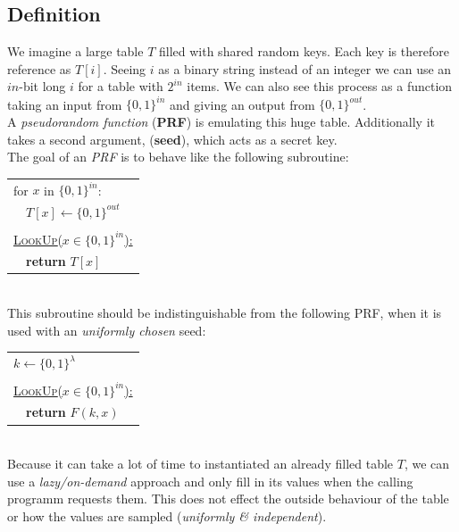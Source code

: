 \documentclass{article}
\begin{document}
		\begin{adjustwidth}{2em}{2em}
			\subsection{Definition}
			\begin{adjustwidth}{2em}{2em}
				We imagine a large table $T$ filled with shared random keys. Each key is therefore reference as $T[i]$. Seeing $i$ as a binary string instead of an integer we can use an $in$-bit long $i$ for a table with $2^{in}$ items. We can also see this process as a function taking an input from $\{ 0,1 \} ^{in}$ and giving an output from $\{ 0,1 \} ^{out}$. \\
				A \textit{pseudorandom function} (\textbf{PRF}) is emulating this huge table. Additionally it takes a second argument, (\textbf{seed}), which acts as a secret key. \\
				The goal of an \textit{PRF} is to behave like the following subroutine: \\
				\begin{center}
					\begin{tabular}{|l|}
						\hline
						for $x$ in $\{ 0,1 \} ^{in}$: \\
						\ \ $T[x] \leftarrow \{ 0,1 \} ^{out}$ \\
						\\
						\underline{\textsc{LookUp}($x \in \{ 0,1 \} ^{in}$):} \\
						\ \ \textbf{return} $T[x]$ \\
						\hline
					\end{tabular}
				\end{center} 
				\hfill \\
				This subroutine should be indistinguishable from the following PRF, when it is used with an \textit{uniformly chosen} seed: \\
				\begin{center}
					\begin{tabular}{|l|}
						\hline
						$k \leftarrow \{ 0,1 \} ^{\lambda}$ \\
						\\
						\underline{\textsc{LookUp}($x \in \{ 0,1 \} ^{in}$):} \\
						\ \ \textbf{return} $F(k,x)$ \\
						\hline
					\end{tabular}
				\end{center}
				\hfill \\
				Because it can take a lot of time to instantiated an already filled table $T$, we can use a \textit{lazy/on-demand} approach and only fill in its values when the calling programm requests them. This does not effect the outside behaviour of the table or how the values are sampled (\textit{uniformly \& independent}). \\

\end{adjustwidth}
\end{adjustwidth}
\end{document}
